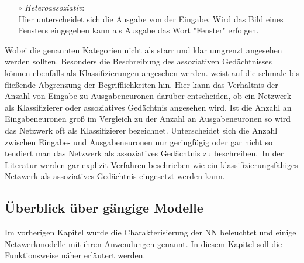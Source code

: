 \begin{itemize}
\begin{itemize}
    \item[$\circ$] \textit{Heteroassoziativ}:\\%
    Hier unterscheidet sich die Ausgabe von der Eingabe. Wird das Bild eines Fensters eingegeben kann als Ausgabe das Wort "Fenster" erfolgen.\,
    
    \end{itemize}

\end{itemize}

Wobei die genannten Kategorien nicht als starr und klar umgrenzt angesehen werden sollten. Besonders die Beschreibung des assoziativen Gedächtnisses können ebenfalls als Klassifizierungen angesehen werden. \citet{Gurney1997} weist auf die schmale bis fließende Abgrenzung der Begrifflichkeiten hin. Hier kann das Verhältnis der Anzahl von Eingabe zu Ausgabeneuronen darüber entscheiden, ob ein Netzwerk als Klassifizierer oder assoziatives Gedächtnis angesehen wird. Ist die Anzahl an Eingabeneuronen groß im Vergleich zu der Anzahl an Ausgabeneuronen so wird das Netzwerk oft als Klassifizierer bezeichnet. Unterscheidet sich die Anzahl zwischen Eingabe- und Ausgabeneuronen nur geringfügig oder gar nicht so tendiert man das Netzwerk als assoziatives Gedächtnis zu beschreiben.\, In der Literatur werden gar explizit Verfahren beschrieben wie ein klassifizierungsfähiges Netzwerk als assoziatives Gedächtnis eingesetzt werden kann.\,




\subsection{Überblick über gängige Modelle}\label{sec:ANN-Modelle}
Im vorherigen Kapitel wurde die Charakterisierung der NN beleuchtet und einige Netzwerkmodelle mit ihren Anwendungen genannt. In diesem Kapitel soll die Funktionsweise näher erläutert werden.

